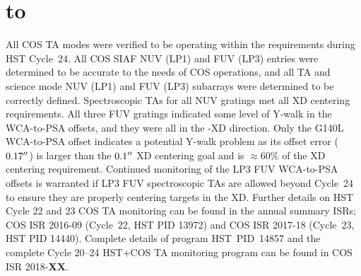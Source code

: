 \documentclass[12pt]{reportj}
\def\arcsec{\hbox{$^{\prime\prime}$}}
\def\ssection#1{\addtocounter{section}{1} \setcounter{subsection}{0} \section*{\hbox to \hsize{\large\bf \arabic{section}. #1\hfill }}}
\begin{document}
\clearpage
\vspace{-0.3cm}
\ssection{Conclusions.\label{sec:theend}}
\vspace{-0.3cm}
All COS TA modes were verified to be operating within the requirements during HST Cycle~24. All COS SIAF NUV (LP1) and FUV (LP3)
entries were determined to be accurate to the needs of COS operations, and all TA and science mode NUV (LP1) and FUV (LP3)
subarrays were determined to be correctly defined.
Spectroscopic TAs for all NUV gratings met all XD centering requirements.
All three FUV gratings indicated some level of Y-walk in the WCA-to-PSA offsets, and they were all in the -XD direction.
Only the G140L WCA-to-PSA offset indicates a potential Y-walk problem as its offset error ($0.17\arcsec$) is larger than the $0.1\arcsec$ XD centering goal and is $\approx 60\%$ of the XD centering requirement.
Continued monitoring of the LP3 FUV WCA-to-PSA offsets is warranted if LP3 FUV spectroscopic TAs are allowed beyond Cycle~24 to ensure they are properly centering targets in the XD.
Further details on HST Cycle 22 and 23 COS TA monitoring can be found in the annual summary ISRs; COS ISR 2016-09 (Cycle~22, HST PID 13972) and COS ISR 2017-18 (Cycle~23, HST PID 14440).
Complete details of program HST~PID~14857 and the complete Cycle 20--24 HST+COS TA monitoring program can be found in COS ISR 2018-{\bf XX}.
\end{document}

